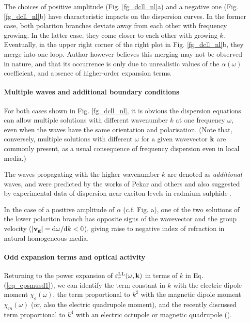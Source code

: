 The choices of positive amplitude (Fig. \ref{fg_dcll_nl}a) and a negative one (Fig. \ref{fg_dcll_nl}b) have characteristic impacts on the dispersion curves. In the former case, both polariton branches deviate away from each other with frequency growing. In the latter case, they come closer to each other with growing $k$. Eventually, in the upper right corner of the right plot in Fig. \ref{fg_dcll_nl}b, they merge into one loop. Author however believes this merging may not be observed in nature, and that its occurrence is only due to unrealistic values of the $\alpha(\omega)$ coefficient, and absence of higher-order expansion terms.

\paragraph{Multiple waves and additional boundary conditions}   %
For both cases shown in Fig. \ref{fg_dcll_nl}, it is obvious the dispersion equations can allow multiple solutions with different wavenumber $k$ at one frequency $\omega$, even when the waves have the same orientation and polarisation. (Note that, conversely, multiple solutions with different $\omega$ for a given wavevector ${\mathbf{k}}$ are commonly present, as a usual consequence of frequency dispersion even in local media.)

The waves propagating with the higher wavenumber $k$ are denoted as \textit{additional} waves, and were predicted by the works of Pekar and others
and also suggested by experimental data of dispersion near exciton levels in cadmium sulphide
\cite{pekar1975spatial}. 

In the case of a positive amplitude of $\alpha$ (c.f. Fig. \label{fg_dcll_nl}a), one of the two solutions of the lower polariton branch has opposite signs of the wavevector and the group velocity ($|{\mathbf{v_g}}| = \mathrm{d}\omega/\mathrm{d}k < 0$), giving raise to negative index of refraction in natural homogeneous media.

\paragraph{Odd expansion terms and optical activity }   %
Returning to the power expansion of $\varepsilon_r^\text{LL}(\omega, {\mathbf{k}})$ in terms of $k$ in Eq. (\ref{eq_epsmusd1}), we can identify the term constant in $k$ with the electric dipole moment $\chi_e(\omega)$, the term proportional to $k^2$ with the magnetic dipole moment $\chi_m(\omega)$ (or, also the electric quadrupole moment), and the recently discussed term proportional to $k^4$ with an electric octupole or magnetic quadrupole (\cite{agranovich2006spatial, agranovich2004linear, krowne2007book}).

